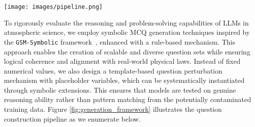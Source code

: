 \begin{figure*}[ht]
    \centering
    \texttt{[image: images/pipeline.png]}
    \caption{Construction pipeline of our template-based question generation framework. Blocks on the middle left represent the question generation process, where variables are highlighted in different colors. Blocks on the middle right depict the automatic problem solver, which derives the answer from given variables. Bottom blocks illustrate an example of a generated question and its corresponding options.}
    \label{fig:generation_framework}
\end{figure*}


To rigorously evaluate the reasoning and problem-solving capabilities of LLMs in atmospheric science, we employ symbolic MCQ generation techniques inspired by the \texttt{GSM-Symbolic} framework~\cite{mirzadeh2024gsm}, enhanced with a rule-based mechanism. This approach enables the creation of scalable and diverse question sets while ensuring logical coherence and alignment with real-world physical laws. Instead of fixed numerical values, we also design a template-based question perturbation mechanism with placeholder variables, which can be systematically instantiated through symbolic extensions. This ensures that models are tested on genuine reasoning ability rather than pattern matching from the potentially contaminated training data. Figure \ref{fig:generation_framework} illustrates the question construction pipeline as we enumerate below.



